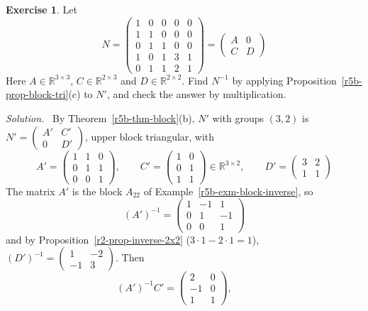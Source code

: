 \documentclass[12pt]{article}
\newcommand{\R}{\mathbb R}
\theoremstyle{definition}
\newtheorem{exercise}{Exercise}
\newenvironment{solution}{\par\noindent\textit{Solution.}\ }{\par\smallskip}
\begin{document}
\begin{exercise}\label{r5b-ex-block-numeric}
Let
\[
N=\left(\begin{array}{ccc|cc}1&0&0&0&0\\1&1&0&0&0\\0&1&1&0&0\\\hline1&0&1&3&1\\0&1&1&2&1\end{array}\right)
=\begin{pmatrix}A&0\\C&D\end{pmatrix}
\]
Here \(A\in\R^{3\times3}\), \(C\in\R^{2\times3}\) and \(D\in\R^{2\times2}\).
Find \(N^{-1}\) by applying Proposition~\ref{r5b-prop-block-tri}(c) to \(N'\), and check the
answer by multiplication.
\end{exercise}
\begin{solution}
By Theorem~\ref{r5b-thm-block}(b), \(N'\) with groups \((3,2)\) is
\(N'=\left(\begin{smallmatrix}A'&C'\\0&D'\end{smallmatrix}\right)\), upper block triangular, with
\[
A'=\begin{pmatrix}1&1&0\\0&1&1\\0&0&1\end{pmatrix},\qquad
C'=\begin{pmatrix}1&0\\0&1\\1&1\end{pmatrix}\in\R^{3\times2},\qquad
D'=\begin{pmatrix}3&2\\1&1\end{pmatrix}
\]
The matrix \(A'\) is the block \(A_{22}\) of Example~\ref{r5b-exm-block-inverse}, so
\[
(A')^{-1}=\begin{pmatrix}1&-1&1\\0&1&-1\\0&0&1\end{pmatrix}
\]
and by Proposition~\ref{r2-prop-inverse-2x2} (\(3\cdot1-2\cdot1=1\)),
\((D')^{-1}=\left(\begin{smallmatrix}1&-2\\-1&3\end{smallmatrix}\right)\). Then
\[
(A')^{-1}C'=\begin{pmatrix}2&0\\-1&0\\1&1\end{pmatrix},\qquad
\]
\end{solution}
\end{document}
